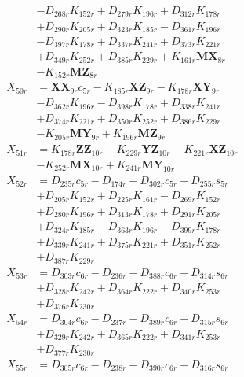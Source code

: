 \begin{multicols}{2}
\begin{align}
&- D_{268r}K_{152r} + D_{279r}K_{196r} + D_{312r}K_{178r}  \nonumber \\
&+ D_{290r}K_{205r} + D_{323r}K_{185r} - D_{361r}K_{196r}  \nonumber \\
&- D_{397r}K_{178r} + D_{337r}K_{241r} + D_{373r}K_{221r}  \nonumber \\
&+ D_{349r}K_{252r} + D_{385r}K_{229r} + K_{161r}\mathbf{MX}_{8r}  \nonumber \\
&- K_{152r}\mathbf{MZ}_{8r} \nonumber \\
X_{50r} &= \mathbf{XX}_{9r}c_{5r} - K_{185r}\mathbf{XZ}_{9r} - K_{178r}\mathbf{XY}_{9r}  \nonumber \\
&- D_{362r}K_{196r} - D_{398r}K_{178r} + D_{338r}K_{241r}  \nonumber \\
&+ D_{374r}K_{221r} + D_{350r}K_{252r} + D_{386r}K_{229r}  \nonumber \\
&- K_{205r}\mathbf{MY}_{9r} + K_{196r}\mathbf{MZ}_{9r} \nonumber \\
X_{51r} &= K_{178r}\mathbf{ZZ}_{10r} - K_{229r}\mathbf{YZ}_{10r} - K_{221r}\mathbf{XZ}_{10r}  \nonumber \\
&- K_{252r}\mathbf{MX}_{10r} + K_{241r}\mathbf{MY}_{10r} \nonumber \\
X_{52r} &= D_{235r}c_{5r} - D_{174r} - D_{302r}c_{5r} - D_{255r}s_{5r}  \nonumber \\
&+ D_{205r}K_{152r} + D_{225r}K_{161r} - D_{269r}K_{152r}  \nonumber \\
&+ D_{280r}K_{196r} + D_{313r}K_{178r} + D_{291r}K_{205r}  \nonumber \\
&+ D_{324r}K_{185r} - D_{363r}K_{196r} - D_{399r}K_{178r}  \nonumber \\
&+ D_{339r}K_{241r} + D_{375r}K_{221r} + D_{351r}K_{252r}  \nonumber \\
&+ D_{387r}K_{229r} \nonumber \\
X_{53r} &= D_{303r}c_{6r} - D_{236r} - D_{388r}c_{6r} + D_{314r}s_{6r}  \nonumber \\
&+ D_{328r}K_{242r} + D_{364r}K_{222r} + D_{340r}K_{253r}  \nonumber \\
&+ D_{376r}K_{230r} \nonumber \\
X_{54r} &= D_{304r}c_{6r} - D_{237r} - D_{389r}c_{6r} + D_{315r}s_{6r}  \nonumber \\
&+ D_{329r}K_{242r} + D_{365r}K_{222r} + D_{341r}K_{253r}  \nonumber \\
&+ D_{377r}K_{230r} \nonumber \\
X_{55r} &= D_{305r}c_{6r} - D_{238r} - D_{390r}c_{6r} + D_{316r}s_{6r}  \nonumber \\

\end{align}
\end{multicols}
